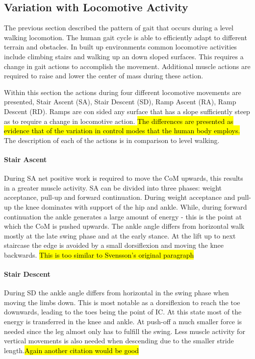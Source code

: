 \subsection{Variation with Locomotive Activity}
The previous section described the pattern of gait that occurs during a level walking locomotion. The human gait cycle is able to efficiently adapt to different terrain and obstacles. In built up environments common locomotive activities include climbing stairs and walking up an down sloped surfaces. This requires a change in gait actions to accomplish the movement. Additional muscle actions are required to raise and lower the center of mass during these action\cite{Franz2012a}. 

Within this section the actions during four different locomotive movements are presented, Stair Ascent (SA), Stair Descent (SD), Ramp Ascent (RA), Ramp Descent (RD). Ramps are con sided any surface that has a slope sufficiently steep as to require a change in locomotive action. \hl{The differences are presented as evidence that of the variation in control modes that the human body employs.} %
The description of each of the actions is in comparison to level walking.

\paragraph{Stair Ascent}
During SA net positive work is required to move the CoM upwards, this results in a greater muscle activity. SA can be divided into three phases: weight acceptance, pull-up and forward continuation. During weight acceptance and pull-up the knee dominates with support of the hip and ankle. While, during forward continuation the ankle generates a large amount of energy - this is the point at which the CoM is pushed upwards. The ankle angle differs from horizontal walk mostly at the late swing phase and at the early stance. At the lift up to next staircase the edge is avoided by a small dorsiflexion and moving the knee backwards.\cite{Svensson2007} \hl{This is too similar to Svensson's original paragraph} 

\paragraph{Stair Descent}
During SD the ankle angle differs from horizontal in the swing phase when moving the limbs down. This is most notable as a dorsiflexion to reach the toe downwards, leading to the toes being the point of IC. At this state most of the energy is transferred in the knee and ankle. At push-off a much smaller force is needed since the leg almost only has to fulfill the swing. Less muscle activity for vertical movements is also needed when descending due to the smaller stride length.\cite{Svensson2007}\hl{Again another citation would be good}

